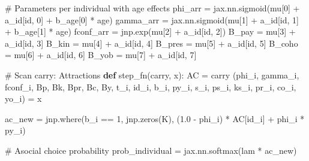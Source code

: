 \documentclass[
  letterpaper,
  DIV=11,
  numbers=noendperiod]{scrartcl}
\newenvironment{Shaded}{\begin{snugshade}}{\end{snugshade}}
\newcommand{\BuiltInTok}[1]{\textcolor[rgb]{0.00,0.23,0.31}{#1}}
\newcommand{\CommentTok}[1]{\textcolor[rgb]{0.37,0.37,0.37}{#1}}
\newcommand{\DecValTok}[1]{\textcolor[rgb]{0.68,0.00,0.00}{#1}}
\newcommand{\FloatTok}[1]{\textcolor[rgb]{0.68,0.00,0.00}{#1}}
\newcommand{\KeywordTok}[1]{\textcolor[rgb]{0.00,0.23,0.31}{\textbf{#1}}}
\newcommand{\NormalTok}[1]{\textcolor[rgb]{0.00,0.23,0.31}{#1}}
\newcommand{\OperatorTok}[1]{\textcolor[rgb]{0.37,0.37,0.37}{#1}}
\begin{document}
\begin{Shaded}
\begin{Highlighting}[]
    \CommentTok{\# Parameters per individual with age effects}
\NormalTok{    phi\_arr   }\OperatorTok{=}\NormalTok{ jax.nn.sigmoid(mu[}\DecValTok{0}\NormalTok{] }\OperatorTok{+}\NormalTok{ a\_id[}\BuiltInTok{id}\NormalTok{, }\DecValTok{0}\NormalTok{] }\OperatorTok{+}\NormalTok{ b\_age[}\DecValTok{0}\NormalTok{] }\OperatorTok{*}\NormalTok{ age)}
\NormalTok{    gamma\_arr }\OperatorTok{=}\NormalTok{ jax.nn.sigmoid(mu[}\DecValTok{1}\NormalTok{] }\OperatorTok{+}\NormalTok{ a\_id[}\BuiltInTok{id}\NormalTok{, }\DecValTok{1}\NormalTok{] }\OperatorTok{+}\NormalTok{ b\_age[}\DecValTok{1}\NormalTok{] }\OperatorTok{*}\NormalTok{ age)}
\NormalTok{    fconf\_arr }\OperatorTok{=}\NormalTok{ jnp.exp(mu[}\DecValTok{2}\NormalTok{] }\OperatorTok{+}\NormalTok{ a\_id[}\BuiltInTok{id}\NormalTok{, }\DecValTok{2}\NormalTok{])}
\NormalTok{    B\_pay     }\OperatorTok{=}\NormalTok{ mu[}\DecValTok{3}\NormalTok{] }\OperatorTok{+}\NormalTok{ a\_id[}\BuiltInTok{id}\NormalTok{, }\DecValTok{3}\NormalTok{]}
\NormalTok{    B\_kin     }\OperatorTok{=}\NormalTok{ mu[}\DecValTok{4}\NormalTok{] }\OperatorTok{+}\NormalTok{ a\_id[}\BuiltInTok{id}\NormalTok{, }\DecValTok{4}\NormalTok{]}
\NormalTok{    B\_pres    }\OperatorTok{=}\NormalTok{ mu[}\DecValTok{5}\NormalTok{] }\OperatorTok{+}\NormalTok{ a\_id[}\BuiltInTok{id}\NormalTok{, }\DecValTok{5}\NormalTok{]}
\NormalTok{    B\_coho    }\OperatorTok{=}\NormalTok{ mu[}\DecValTok{6}\NormalTok{] }\OperatorTok{+}\NormalTok{ a\_id[}\BuiltInTok{id}\NormalTok{, }\DecValTok{6}\NormalTok{]}
\NormalTok{    B\_yob     }\OperatorTok{=}\NormalTok{ mu[}\DecValTok{7}\NormalTok{] }\OperatorTok{+}\NormalTok{ a\_id[}\BuiltInTok{id}\NormalTok{, }\DecValTok{7}\NormalTok{]}

    \CommentTok{\# Scan carry: Attractions}
    \KeywordTok{def}\NormalTok{ step\_fn(carry, x):}
\NormalTok{        AC }\OperatorTok{=}\NormalTok{ carry}
\NormalTok{        (phi\_i, gamma\_i, fconf\_i, Bp, Bk, Bpr, Bc, By, t\_i, id\_i, b\_i, py\_i, s\_i, ps\_i, ks\_i, pr\_i, co\_i, yo\_i) }\OperatorTok{=}\NormalTok{ x}

\NormalTok{        ac\_new }\OperatorTok{=}\NormalTok{ jnp.where(b\_i }\OperatorTok{==} \DecValTok{1}\NormalTok{, jnp.zeros(K), (}\FloatTok{1.0} \OperatorTok{{-}}\NormalTok{ phi\_i) }\OperatorTok{*}\NormalTok{ AC[id\_i] }\OperatorTok{+}\NormalTok{ phi\_i }\OperatorTok{*}\NormalTok{ py\_i)}
        
        \CommentTok{\# Asocial choice probability}
\NormalTok{        prob\_individual }\OperatorTok{=}\NormalTok{ jax.nn.softmax(lam }\OperatorTok{*}\NormalTok{ ac\_new)}


\end{Highlighting}
\end{Shaded}
\end{document}
